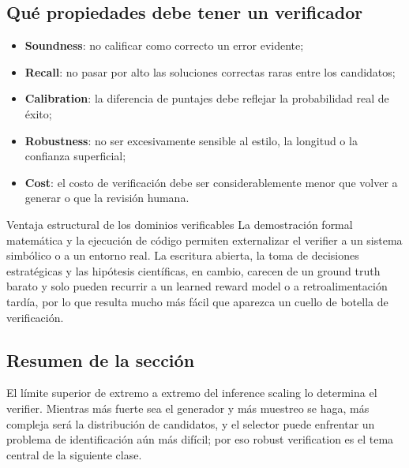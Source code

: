 \subsection{Qué propiedades debe tener un verificador}

\begin{itemize}
    \item \textbf{Soundness}: no calificar como correcto un error evidente;
    \item \textbf{Recall}: no pasar por alto las soluciones correctas raras entre los candidatos;
    \item \textbf{Calibration}: la diferencia de puntajes debe reflejar la probabilidad real de éxito;
    \item \textbf{Robustness}: no ser excesivamente sensible al estilo, la longitud o la confianza superficial;
    \item \textbf{Cost}: el costo de verificación debe ser considerablemente menor que volver a generar o que la revisión humana.
\end{itemize}

\begin{knowledgebox}{Ventaja estructural de los dominios verificables}
La demostración formal matemática y la ejecución de código permiten externalizar el verifier a un sistema simbólico o a un entorno real. La escritura abierta, la toma de decisiones estratégicas y las hipótesis científicas, en cambio, carecen de un ground truth barato y solo pueden recurrir a un learned reward model o a retroalimentación tardía, por lo que resulta mucho más fácil que aparezca un cuello de botella de verificación.
\end{knowledgebox}

\subsection{Resumen de la sección}

El límite superior de extremo a extremo del inference scaling lo determina el verifier. Mientras más fuerte sea el generador y más muestreo se haga, más compleja será la distribución de candidatos, y el selector puede enfrentar un problema de identificación aún más difícil; por eso robust verification es el tema central de la siguiente clase.
